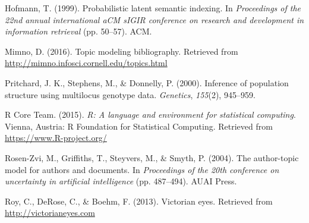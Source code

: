 \documentclass[12pt,]{article}
\begin{document}
\hypertarget{ref-hofmann1999probabilistic}{}
Hofmann, T. (1999). Probabilistic latent semantic indexing. In
\emph{Proceedings of the 22nd annual international aCM sIGIR conference
on research and development in information retrieval} (pp. 50--57). ACM.

\hypertarget{ref-mimno2016topic}{}
Mimno, D. (2016). Topic modeling bibliography. Retrieved from
\url{http://mimno.infosci.cornell.edu/topics.html}

\hypertarget{ref-pritchard2000inference}{}
Pritchard, J. K., Stephens, M., \& Donnelly, P. (2000). Inference of
population structure using multilocus genotype data. \emph{Genetics},
\emph{155}(2), 945--959.

\hypertarget{ref-r2015}{}
R Core Team. (2015). \emph{R: A language and environment for statistical
computing}. Vienna, Austria: R Foundation for Statistical Computing.
Retrieved from \url{https://www.R-project.org/}

\hypertarget{ref-rosen2004author}{}
Rosen-Zvi, M., Griffiths, T., Steyvers, M., \& Smyth, P. (2004). The
author-topic model for authors and documents. In \emph{Proceedings of
the 20th conference on uncertainty in artificial intelligence} (pp.
487--494). AUAI Press.

\hypertarget{ref-roy2013victorian}{}
Roy, C., DeRose, C., \& Boehm, F. (2013). Victorian eyes. Retrieved from
\url{http://victorianeyes.com}
\end{document}

